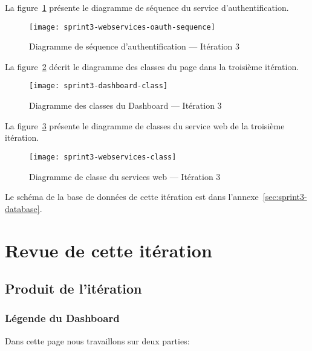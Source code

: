 La figure~\ref{fig:sprint3-webservices-oauth-sequence} présente le diagramme de
séquence du service d'authentification.

\begin{figure}[H]
    \centering
    \texttt{[image: sprint3-webservices-oauth-sequence]}
    \caption{Diagramme de séquence d'authentification --- Itération 3}
\label{fig:sprint3-webservices-oauth-sequence}
\end{figure}

La figure~\ref{fig:sprint3-dashboard-classs} décrit le diagramme des classes du
page  dans la troisième itération.

\begin{figure}[H]
    \centering
    \texttt{[image: sprint3-dashboard-class]}
    \caption{Diagramme des classes du Dashboard --- Itération 3}
\label{fig:sprint3-dashboard-classs}
\end{figure}

La figure~\ref{fig:sprint3-webservices-class} présente le diagramme de classes
du service web de la troisième itération.

\begin{figure}[H]
    \centering
    \texttt{[image: sprint3-webservices-class]}
    \caption{Diagramme de classe du services web --- Itération 3}
\label{fig:sprint3-webservices-class}
\end{figure}

Le schéma de la base de données de cette itération est dans
l'annexe~\ref{sec:sprint3-database}.

\section{Revue de cette itération}


\subsection{Produit de l'itération}

\subsubsection{Légende du Dashboard}

Dans cette page nous travaillons sur deux parties:


